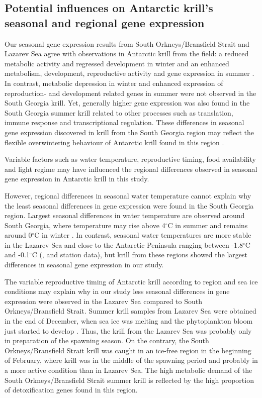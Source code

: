 \subsection{Potential influences on Antarctic krill's seasonal and regional gene expression}

Our seasonal  gene expression results from South Orkneys/Bransfield Strait and
Lazarev Sea agree with observations in Antarctic krill from the field: a
reduced metabolic activity and regressed development in winter and an enhanced
metabolism, development, reproductive activity and gene expression in summer
\citep{meyer_seasonal_2010, siegel_krill_2012}. In contrast, metabolic
depression in winter and enhanced expression of reproduction- and development
related genes in summer were not observed in the South Georgia krill.  Yet,
generally higher gene expression was also found in the South Georgia summer
krill related to other processes such as translation, immune response and
transcriptional regulation. These differences in seasonal gene expression
discovered in krill from the South Georgia region may reflect the flexible
overwintering behaviour of Antarctic krill found in this region
\citep{schmidt_feeding_2014}.

Variable factors such as water temperature, reproductive timing, food
availability and light regime may have influenced the regional differences
observed in seasonal gene expression in Antarctic krill in this study.

However, regional differences in seasonal water temperature cannot explain why
the least seasonal differences in gene expression were found in the South
Georgia region. Largest seasonal differences in water temperature are observed
around South Georgia, where temperature may rise above 4$^{\circ}$C in summer
and remains around 0$^{\circ}$C in winter \citep{whitehouse_seasonal_1996}. In
contrast, seasonal water temperatures are more stable in the Lazarev Sea and
close to the Antarctic Peninsula ranging between -1.8$^{\circ}$C  and
-0.1$^{\circ}$C (\citet{meyer_seasonal_2010}, and station data), but krill from
these regions showed the largest differences in seasonal gene expression in our
study.

The variable reproductive timing of Antarctic krill according to region and sea
ice conditions \citep{spiridonov_spatial_1995} may explain why in our study
less seasonal differences in gene expression were observed in the Lazarev Sea
compared to South Orkneys/Bransfield Strait. Summer krill samples from Lazarev
Sea were obtained in the end of December, when sea ice was melting and the
phytoplankton bloom just started to develop \citep{meyer_seasonal_2010}. Thus,
the krill from the Lazarev Sea was probably only in preparation of the spawning
season. On the contrary, the South Orkneys/Bransfield Strait krill was caught
in an ice-free region in the beginning of February, where krill was in the
middle of the spawning period and probably in a more active condition than in
Lazarev Sea.  The high metabolic demand of the South Orkneys/Bransfield Strait
summer krill is reflected by the high proportion of detoxification genes found
in this region.

